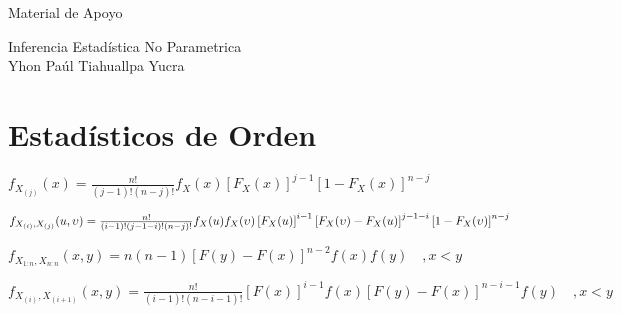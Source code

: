 \documentclass[12pt]{article}
\begin{document}
 


\begin{center}
  \Huge{Material de Apoyo}
\end{center}

\begin{center}
\Large{Inferencia Estadística No Parametrica}  \\  
\small{Yhon Paúl Tiahuallpa Yucra}\\
\end{center}


\section{Estadísticos de Orden}

\begin{tcolorbox}[colback=white,colframe=black,width=12cm ,coltitle=white, title = Función de Densidad $X_{(j)}$  ]
\begin{center}
$
f_{X_{(j)}}(x) = \frac{n!}{(j-1)!(n-j)!} f_{X}(x)\left [ F_X (x) \right ]^{j-1} \left [ 1 -  F_X (x) \right ]^{n-j}
$
\end{center}
\end{tcolorbox}



\begin{tcolorbox}[colback=white,colframe=black,width=18cm ,coltitle=white, title = Función de Distribución Conjunta $X_{(i)}$ y $X_{(j)}$  ]
\begin{center}
$
\footnotesize{
f_{X_{(i)},X_{(j)}}(u, \upsilon) = \frac{n!}{(i-1)!(j-1-i)!(n-j)!} f_{X}(u)f_{X}(\upsilon)\left [ F_X (u) \right ]^{i-1} \left [ F_{X}(\upsilon) -  F_X (u) \right ]^{j-1-i} \left [ 1 -  F_X (\upsilon) \right ]^{n-j}
}  $
\end{center}
\end{tcolorbox}



\begin{tcolorbox}[colback=white,colframe=black,width=12cm ,coltitle=white , title = Densidad conjunta del máximo y el mínimo]
\begin{center}
$
f_{X_{1:n},X_{n:n}}(x, y) = n(n-1)\left [ F(y) - F(x) \right ]^{n-2} f(x)f(y) \quad ,x<y
$ 
\end{center}
\end{tcolorbox}




\begin{tcolorbox}[colback=white,colframe=black,width=17cm ,coltitle=white, title = Densidad conjunta de dos estadísticas de orden consecutivas]
\begin{center}
$
f_{X_{(i)},X_{(i+1)}}(x, y) = \frac{n!}{(i-1)!(n-i-1)!} \left [ F(x) \right ]^{i-1} f(x) \left [ F(y) -  F(x) \right ]^{n-i-1}  f(y) \quad ,x<y
$ 
\end{center}
\end{tcolorbox}
\end{document}
